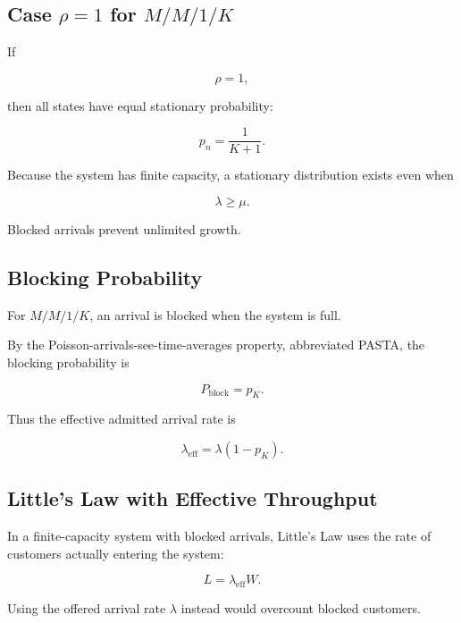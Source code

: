 \subsection{Case \(\rho=1\) for \(M/M/1/K\)}
\label{subsec:mm1k-rho-one}

If

\[
\rho=1,
\]

then all states have equal stationary probability:

\[
\boxed{
p_n
=
\frac1{K+1}.
}
\]

Because the system has finite capacity, a stationary distribution exists
even when

\[
\lambda\geq\mu.
\]

Blocked arrivals prevent unlimited growth.

\subsection{Blocking Probability}
\label{subsec:blocking-probability}

For \(M/M/1/K\), an arrival is blocked when the system is full.

By the Poisson-arrivals-see-time-averages property, abbreviated PASTA,
the blocking probability is

\[
\boxed{
P_{\mathrm{block}}
=
p_K.
}
\]

Thus the effective admitted arrival rate is

\[
\boxed{
\lambda_{\mathrm{eff}}
=
\lambda(1-p_K).
}
\]

\subsection{Little's Law with Effective Throughput}
\label{subsec:littles-law-finite-capacity}

In a finite-capacity system with blocked arrivals, Little's Law uses the
rate of customers actually entering the system:

\[
\boxed{
L
=
\lambda_{\mathrm{eff}}W.
}
\]

Using the offered arrival rate \(\lambda\) instead would overcount blocked
customers.


